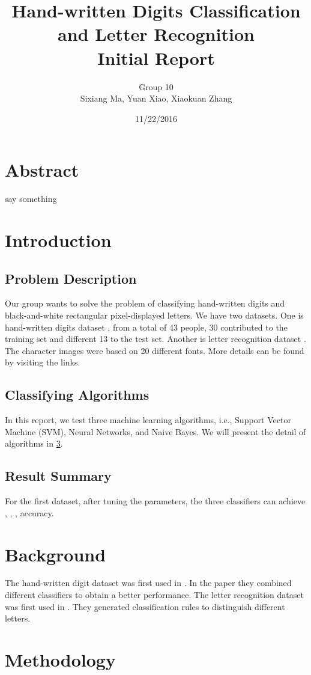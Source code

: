 \documentclass[11pt]{article}
\title{Hand-written Digits Classification and Letter Recognition\\
Initial Report}
\author{Group 10 \\ Sixiang Ma, Yuan Xiao, Xiaokuan Zhang}
\date{11/22/2016}
\begin{document}
\maketitle
\section*{Abstract}
say something

\section{Introduction}

\subsection{Problem Description}
Our group wants to solve the problem of classifying hand-written digits and  black-and-white rectangular pixel-displayed letters. We have two datasets. One is hand-written digits dataset \cite{digitdataset}, from a total of 43 people, 30 contributed to the training set and different 13 to the test set. Another is letter recognition dataset \cite{letterdataset}. The character images were based on 20 different fonts. More details can be found by visiting the links.

\subsection{Classifying Algorithms}
In this report, we test three machine learning  algorithms, i.e., Support Vector Machine (SVM), Neural Networks, and Naive Bayes. We will present the detail of algorithms in \ref{sec:metho}.
\subsection{Result Summary}
For the first dataset, after tuning the parameters, the three classifiers can achieve , , , accuracy. 

\section{Background}
The hand-written digit dataset was first used in \cite{kaynak1995methods}. In the paper they combined different classifiers to obtain a better performance. The letter recognition dataset was first used in \cite{frey1991letter}. They generated classification rules to distinguish different letters.

\section{Methodology}\label{sec:metho}
\end{document}
